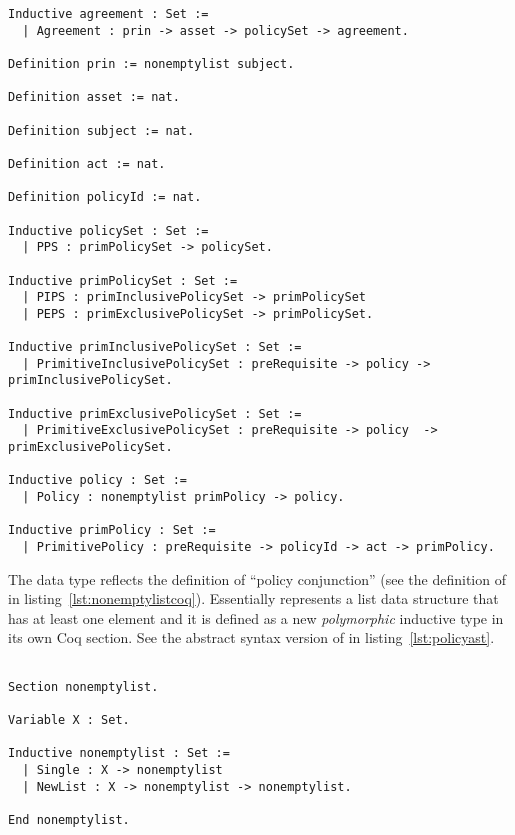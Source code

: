 \lstset{language=Coq}
\begin{minipage}[c]{0.95\textwidth}
\begin{lstlisting}[frame=single, caption={ACCPL: Coq Version of Agreement},label={lst:agreementcoq}]
Inductive agreement : Set :=
  | Agreement : prin -> asset -> policySet -> agreement.

Definition prin := nonemptylist subject.

Definition asset := nat.

Definition subject := nat.

Definition act := nat.

Definition policyId := nat.

Inductive policySet : Set :=
  | PPS : primPolicySet -> policySet.
  
Inductive primPolicySet : Set :=
  | PIPS : primInclusivePolicySet -> primPolicySet
  | PEPS : primExclusivePolicySet -> primPolicySet.

Inductive primInclusivePolicySet : Set :=
  | PrimitiveInclusivePolicySet : preRequisite -> policy -> primInclusivePolicySet.

Inductive primExclusivePolicySet : Set :=
  | PrimitiveExclusivePolicySet : preRequisite -> policy  -> primExclusivePolicySet.

Inductive policy : Set :=
  | Policy : nonemptylist primPolicy -> policy.

Inductive primPolicy : Set :=
  | PrimitivePolicy : preRequisite -> policyId -> act -> primPolicy.

\end{lstlisting}
\end{minipage}

The data type  reflects the definition of ``policy conjunction'' (see the definition of  in listing~\ref{lst:nonemptylistcoq}). Essentially  represents a list data structure that has at least one element and it is defined as a new \emph{polymorphic} inductive type in its own Coq section. See the abstract syntax version of  in listing~\ref{lst:policyast}. 


\begin{minipage}[c]{0.95\textwidth}
\begin{lstlisting}

Section nonemptylist.

Variable X : Set.

Inductive nonemptylist : Set :=
  | Single : X -> nonemptylist 
  | NewList : X -> nonemptylist -> nonemptylist.

End nonemptylist.
\end{lstlisting}
\end{minipage}


